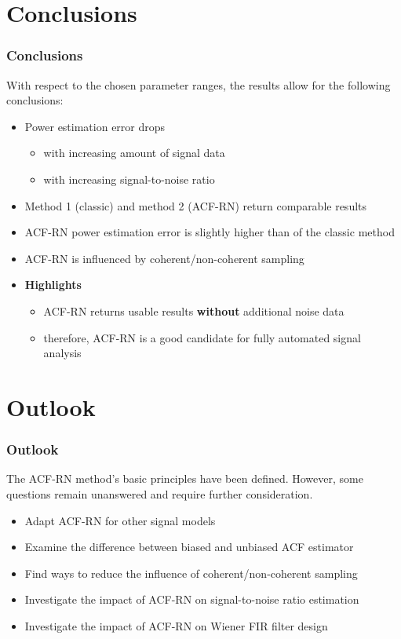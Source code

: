 \documentclass[11pt,aspectratio=169]{beamer}
\begin{document}
	\section{Conclusions}
	\begin{frame}
		\frametitle{Conclusions}
		With respect to the chosen parameter ranges, the results allow for the following conclusions:
		\vspace*{1em}
		\begin{itemize}
			\item Power estimation error drops
			\begin{itemize}
				\item with increasing amount of signal data
				\item with increasing signal-to-noise ratio
			\end{itemize}
			\item Method 1 (classic) and method 2 (ACF-RN) return comparable results
			\item ACF-RN power estimation error is slightly higher than of the classic method
			\item ACF-RN is influenced by coherent/non-coherent sampling
			\item \textbf{Highlights}
			\begin{itemize}
				\item ACF-RN returns usable results \textbf{without} additional noise data
				\item therefore, ACF-RN is a good candidate for fully automated signal analysis
			\end{itemize}
		\end{itemize}
	\end{frame}
	\section{Outlook}
	\begin{frame}
		\frametitle{Outlook}
		The ACF-RN method's basic principles have been defined. However, some questions remain unanswered and require further consideration.
		\vspace*{1em}
		\begin{itemize}
			\item Adapt ACF-RN for other signal models
			\item Examine the difference between biased and unbiased ACF estimator
			\item Find ways to reduce the influence of coherent/non-coherent sampling
			\item Investigate the impact of ACF-RN on signal-to-noise ratio estimation
			\item Investigate the impact of ACF-RN on Wiener FIR filter design
		\end{itemize}
	\end{frame}
\end{document}
